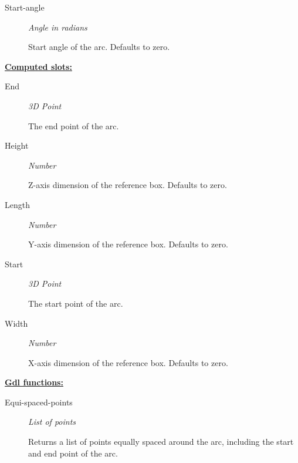 \documentclass [11pt]{book}
\begin{document}
\begin{itemize}
\begin{description}
\item [Start-angle]
\emph{Angle in radians}

 Start angle of the arc. Defaults to zero.




\end{description}






\textbf{
\underline{Computed slots:}}

\begin{description}

\item [End]
\emph{3D Point}

 The end point of the arc.




\item [Height]
\emph{Number}

 Z-axis dimension of the reference box. Defaults to zero.




\item [Length]
\emph{Number}

 Y-axis dimension of the reference box. Defaults to zero.




\item [Start]
\emph{3D Point}

 The start point of the arc.




\item [Width]
\emph{Number}

 X-axis dimension of the reference box. Defaults to zero.




\end{description}






\textbf{
\underline{Gdl functions:}}

\begin{description}

\item [Equi-spaced-points]
\emph{List of points}

 Returns a list of points equally spaced around the arc, including
the start and end point of the arc.





\end{description}
\end{itemize}
\end{document}
